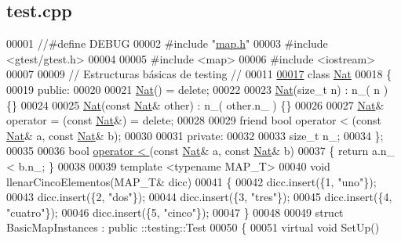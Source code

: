 \hypertarget{test_8cpp_source}{}\subsection{test.\+cpp}

\begin{DoxyCode}
00001 \textcolor{comment}{//#define DEBUG}
00002 \textcolor{preprocessor}{#include "\hyperlink{map_8h}{map.h}"}
00003 \textcolor{preprocessor}{#include <gtest/gtest.h>}
00004 
00005 \textcolor{preprocessor}{#include <map>}
00006 \textcolor{preprocessor}{#include <iostream>}
00007 
00009 \textcolor{comment}{// Estructuras básicas de testing //}
00011 \textcolor{comment}{}
\hyperlink{classNat}{00017} \textcolor{keyword}{class }\hyperlink{classNat}{Nat}
00018 \{
00019     \textcolor{keyword}{public}:
00020 
00021         \hyperlink{classNat}{Nat}() = \textcolor{keyword}{delete};
00022 
00023         \hyperlink{classNat}{Nat}(\textcolor{keywordtype}{size\_t} n) : n\_( n ) \{\}
00024 
00025         \hyperlink{classNat}{Nat}(\textcolor{keyword}{const} \hyperlink{classNat}{Nat}& other) : n\_( other.n\_ ) \{\}
00026 
00027         \hyperlink{classNat}{Nat}& operator = (\textcolor{keyword}{const} \hyperlink{classNat}{Nat}&) = \textcolor{keyword}{delete};
00028 
00029         \textcolor{keyword}{friend} \textcolor{keywordtype}{bool} operator < (\textcolor{keyword}{const} \hyperlink{classNat}{Nat}& a, \textcolor{keyword}{const} \hyperlink{classNat}{Nat}& b);
00030 
00031     \textcolor{keyword}{private}:
00032 
00033         \textcolor{keywordtype}{size\_t} n\_;
00034 \};
00035 
00036 \textcolor{keywordtype}{bool} \hyperlink{classaed2_1_1map_a8ff07f6a24c290ea7e8f63ec7ab24f8d_a8ff07f6a24c290ea7e8f63ec7ab24f8d}{operator < }(\textcolor{keyword}{const} \hyperlink{classNat}{Nat}& a, \textcolor{keyword}{const} \hyperlink{classNat}{Nat}& b)
00037 \{ \textcolor{keywordflow}{return} a.n\_ < b.n\_; \}
00038 
00039 \textcolor{keyword}{template} <\textcolor{keyword}{typename} MAP\_T>
00040 \textcolor{keywordtype}{void} llenarCincoElementos(MAP\_T& dicc)
00041 \{
00042     dicc.insert(\{1, \textcolor{stringliteral}{"uno"}\});
00043     dicc.insert(\{2, \textcolor{stringliteral}{"dos"}\});
00044     dicc.insert(\{3, \textcolor{stringliteral}{"tres"}\});
00045     dicc.insert(\{4, \textcolor{stringliteral}{"cuatro"}\});
00046     dicc.insert(\{5, \textcolor{stringliteral}{"cinco"}\});
00047 \}
00048 
00049 \textcolor{keyword}{struct }BasicMapInstances : \textcolor{keyword}{public} ::testing::Test
00050 \{
00051     \textcolor{keyword}{virtual} \textcolor{keywordtype}{void} SetUp()

\end{DoxyCode}
